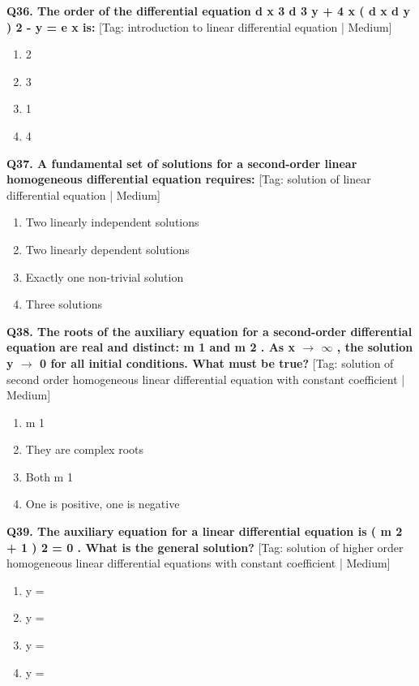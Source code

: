 \noindent\textbf{Q36. The order of the differential equation d x 3 d 3 y + 4 x ( d x d y ) 2 - y = e x is:} \hfill [Tag: introduction to linear differential equation | Medium]
\begin{enumerate}[label=(\alph*),topsep=2pt,itemsep=1pt,partopsep=0pt,parsep=0pt]
    \item {{2}}
    \item {{3}}
    \item {{1}}
    \item {{4}}
\end{enumerate}
\vspace{2mm}

\noindent\textbf{Q37. A fundamental set of solutions for a second-order linear homogeneous differential equation requires:} \hfill [Tag: solution of linear differential equation | Medium]
\begin{enumerate}[label=(\alph*),topsep=2pt,itemsep=1pt,partopsep=0pt,parsep=0pt]
    \item {{Two linearly independent solutions}}
    \item {{Two linearly dependent solutions}}
    \item {{Exactly one non-trivial solution}}
    \item {{Three solutions}}
\end{enumerate}
\vspace{2mm}

\noindent\textbf{Q38. The roots of the auxiliary equation for a second-order differential equation are real and distinct: m 1 and m 2 . As x $\to$ $\infty$ , the solution y $\to$ 0 for all initial conditions. What must be true?} \hfill [Tag: solution of second order homogeneous linear differential equation with constant coefficient | Medium]
\begin{enumerate}[label=(\alph*),topsep=2pt,itemsep=1pt,partopsep=0pt,parsep=0pt]
    \item {{m 1}}
    \item {{They are complex roots}}
    \item {{Both m 1}}
    \item {{One is positive, one is negative}}
\end{enumerate}
\vspace{2mm}

\noindent\textbf{Q39. The auxiliary equation for a linear differential equation is ( m 2 + 1 ) 2 = 0 . What is the general solution?} \hfill [Tag: solution of higher order homogeneous linear differential equations with constant coefficient | Medium]
\begin{enumerate}[label=(\alph*),topsep=2pt,itemsep=1pt,partopsep=0pt,parsep=0pt]
    \item {{y =}}
    \item {{y =}}
    \item {{y =}}
    \item {{y =}}
\end{enumerate}
\vspace{2mm}

